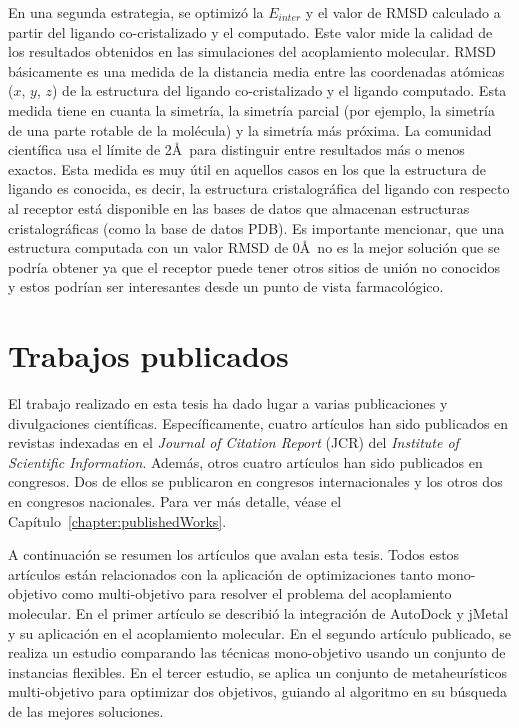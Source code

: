En una segunda estrategia, se optimizó la $E_{inter}$ y el valor de RMSD calculado a partir del ligando co-cristalizado y el computado. Este valor mide la calidad de los resultados obtenidos en las simulaciones del acoplamiento molecular. RMSD básicamente es una medida de la distancia media entre las coordenadas atómicas ($x$, $y$, $z$) de la estructura del ligando co-cristalizado y el ligando computado. Esta medida tiene en cuanta la simetría, la simetría parcial (por ejemplo, la simetría de una parte rotable de la molécula) y la simetría más próxima. La comunidad científica usa el límite de 2\AA\ para distinguir entre resultados más o menos exactos. Esta medida es muy útil en aquellos casos en los que la estructura de ligando es conocida, es decir, la estructura cristalográfica del ligando con respecto al receptor está disponible en las bases de datos que almacenan estructuras cristalográficas (como la base de datos PDB). Es importante mencionar, que una estructura computada con un valor RMSD de 0\AA\ no es la mejor solución que se podría obtener ya que el receptor puede tener otros sitios de unión no conocidos y estos podrían ser interesantes desde un punto de vista farmacológico.


\section*{Trabajos publicados}

El trabajo realizado en esta tesis ha dado lugar a varias publicaciones y divulgaciones científicas. Específicamente, cuatro artículos han sido publicados en revistas indexadas en el \emph{Journal of Citation Report} (JCR) del \emph{Institute of Scientific Information}. Además, otros cuatro artículos han sido publicados en congresos. Dos de ellos se publicaron en congresos internacionales y los otros dos en congresos nacionales. Para ver más detalle, véase el Capítulo~\ref{chapter:publishedWorks}.

A continuación se resumen los artículos que avalan esta tesis. Todos estos artículos están relacionados con la aplicación de optimizaciones tanto mono-objetivo como multi-objetivo para resolver el problema del acoplamiento molecular. En el primer artículo se describió la integración de AutoDock y jMetal y su aplicación en el acoplamiento molecular. En el segundo artículo publicado, se realiza un estudio comparando las técnicas mono-objetivo usando un conjunto de instancias flexibles. En el tercer estudio, se aplica un conjunto de metaheurísticos multi-objetivo para optimizar dos objetivos, guiando al algoritmo en su búsqueda de las mejores soluciones.

